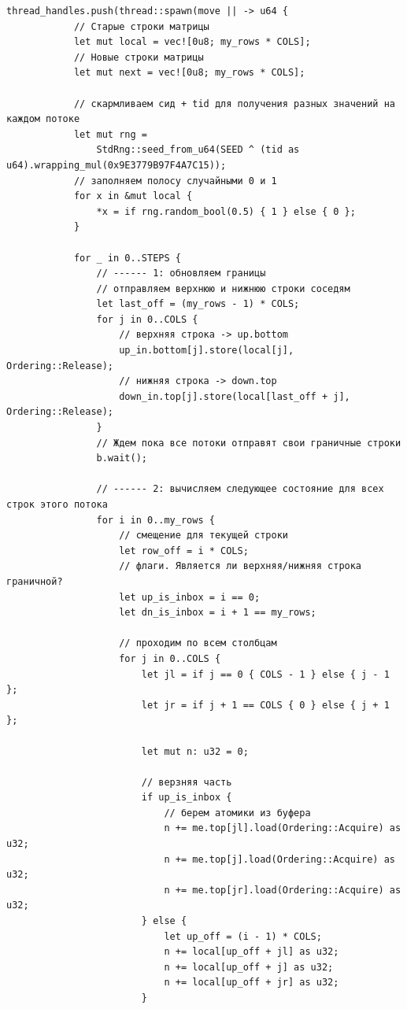 \documentclass[a4paper, 14pt]{extarticle}
\begin{document}
\begin{lstlisting}[caption={Исходный код программы для задачи 1}, label={lst:source_code}]
        thread_handles.push(thread::spawn(move || -> u64 {
            // Старые строки матрицы
            let mut local = vec![0u8; my_rows * COLS];
            // Новые строки матрицы
            let mut next = vec![0u8; my_rows * COLS];

            // скармливаем сид + tid для получения разных значений на каждом потоке
            let mut rng =
                StdRng::seed_from_u64(SEED ^ (tid as u64).wrapping_mul(0x9E3779B97F4A7C15));
            // заполняем полосу случайными 0 и 1
            for x in &mut local {
                *x = if rng.random_bool(0.5) { 1 } else { 0 };
            }

            for _ in 0..STEPS {
                // ------ 1: обновляем границы
                // отправляем верхнюю и нижнюю строки соседям
                let last_off = (my_rows - 1) * COLS;
                for j in 0..COLS {
                    // верхняя строка -> up.bottom
                    up_in.bottom[j].store(local[j], Ordering::Release);
                    // нижняя строка -> down.top
                    down_in.top[j].store(local[last_off + j], Ordering::Release);
                }
                // Ждем пока все потоки отправят свои граничные строки
                b.wait();

                // ------ 2: вычисляем следующее состояние для всех строк этого потока
                for i in 0..my_rows {
                    // смещение для текущей строки
                    let row_off = i * COLS;
                    // флаги. Является ли верхняя/нижняя строка граничной?
                    let up_is_inbox = i == 0;
                    let dn_is_inbox = i + 1 == my_rows;

                    // проходим по всем столбцам
                    for j in 0..COLS {
                        let jl = if j == 0 { COLS - 1 } else { j - 1 };
                        let jr = if j + 1 == COLS { 0 } else { j + 1 };

                        let mut n: u32 = 0;

                        // верзняя часть
                        if up_is_inbox {
                            // берем атомики из буфера
                            n += me.top[jl].load(Ordering::Acquire) as u32;
                            n += me.top[j].load(Ordering::Acquire) as u32;
                            n += me.top[jr].load(Ordering::Acquire) as u32;
                        } else {
                            let up_off = (i - 1) * COLS;
                            n += local[up_off + jl] as u32;
                            n += local[up_off + j] as u32;
                            n += local[up_off + jr] as u32;
                        }


\end{lstlisting}
\end{document}
